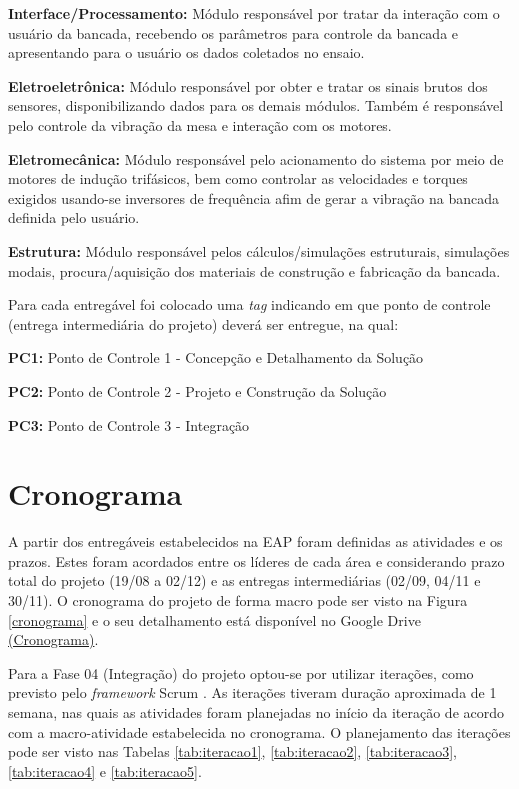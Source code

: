 \textbf{Interface/Processamento:} Módulo responsável por tratar da interação com o usuário da bancada, recebendo os parâmetros para controle da bancada e apresentando para o usuário os dados coletados no ensaio.

\textbf{Eletroeletrônica:} Módulo responsável por obter e tratar os sinais brutos dos sensores, disponibilizando dados para os demais módulos. Também é responsável pelo controle da vibração da mesa e interação com os motores.

\textbf{Eletromecânica:} Módulo responsável pelo acionamento do sistema por meio de motores de indução trifásicos, bem como controlar as velocidades e torques exigidos usando-se inversores de frequência afim de gerar a vibração na bancada definida pelo usuário.

\textbf{Estrutura:} Módulo responsável pelos cálculos/simulações estruturais, simulações modais, procura/aquisição dos materiais de construção e fabricação da bancada.

Para cada entregável foi colocado uma \textit{tag} indicando em que ponto de controle (entrega intermediária do projeto) deverá ser entregue, na qual:

\indent \textbf{PC1:} Ponto de Controle 1 - Concepção e Detalhamento da Solução

\indent \textbf{PC2:} Ponto de Controle 2 - Projeto e Construção da Solução

\indent \textbf{PC3:} Ponto de Controle 3 - Integração

\section*{Cronograma}

A partir dos entregáveis estabelecidos na EAP foram definidas as atividades e os prazos. Estes foram acordados entre os líderes de
cada área e considerando prazo total do projeto (19/08 a 02/12) e as entregas intermediárias (02/09, 04/11 e 30/11).
O cronograma do projeto de forma macro pode ser visto na Figura \ref{cronograma} e o seu detalhamento está disponível
no Google Drive \href{https://drive.google.com/file/d/0B28JW3Vcm0jLdElSSGNPcU4yVEU/view?usp=sharing}{(Cronograma)}.

Para a Fase 04 (Integração) do projeto optou-se por utilizar iterações, como previsto pelo
\textit{framework} Scrum \cite{scrum}.
As iterações tiveram duração aproximada de 1 semana,
nas quais as atividades foram planejadas no início da iteração de acordo
com a macro-atividade estabelecida no cronograma. O planejamento das iterações pode ser visto nas Tabelas \ref{tab:iteracao1},
\ref{tab:iteracao2}, \ref{tab:iteracao3}, \ref{tab:iteracao4} e \ref{tab:iteracao5}.

